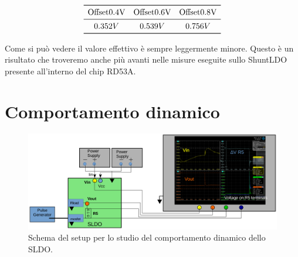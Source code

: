 \[
\begin{array}{ccc}

\toprule
\mathrm{Offset 0.4 V} & \mathrm{Offset 0.6 V} & \mathrm{Offset 0.8 V} \\

\midrule

0.352 V & 0.539 V & 0.756 V \\

\bottomrule
\end{array}
\]

Come si può vedere il valore effettivo è sempre leggermente minore. Questo è un risultato che troveremo anche più avanti nelle misure eseguite sullo ShuntLDO presente all'interno del chip RD53A. 

\section{Comportamento dinamico}

\begin{figure}
\centering
\includegraphics[scale=.3]{Immagini/SetupScheme}
\caption{Schema del setup per lo studio del comportamento dinamico dello SLDO.}
\label{Setupscheme}
\end{figure}

